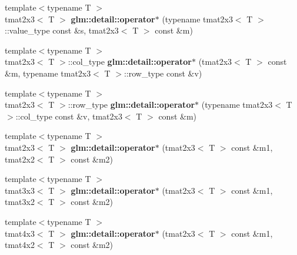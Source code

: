 \begin{DoxyCompactItemize}
\item 
\hypertarget{namespaceglm_1_1detail_a4c09dd8ee896836a72872073c92da81e}{{\footnotesize template$<$typename T $>$ }\\tmat2x3$<$ \-T $>$ {\bfseries glm\-::detail\-::operator$\ast$} (typename tmat2x3$<$ \-T $>$\-::value\-\_\-type const \&s, tmat2x3$<$ \-T $>$ const \&m)}\label{namespaceglm_1_1detail_a4c09dd8ee896836a72872073c92da81e}

\item 
\hypertarget{namespaceglm_1_1detail_a79596c9025879da74bbbcdca8846287b}{{\footnotesize template$<$typename T $>$ }\\tmat2x3$<$ \-T $>$\-::col\-\_\-type {\bfseries glm\-::detail\-::operator$\ast$} (tmat2x3$<$ \-T $>$ const \&m, typename tmat2x3$<$ \-T $>$\-::row\-\_\-type const \&v)}\label{namespaceglm_1_1detail_a79596c9025879da74bbbcdca8846287b}

\item 
\hypertarget{namespaceglm_1_1detail_afd8b1f49e105e275ed1ecdce26bd4228}{{\footnotesize template$<$typename T $>$ }\\tmat2x3$<$ \-T $>$\-::row\-\_\-type {\bfseries glm\-::detail\-::operator$\ast$} (typename tmat2x3$<$ \-T $>$\-::col\-\_\-type const \&v, tmat2x3$<$ \-T $>$ const \&m)}\label{namespaceglm_1_1detail_afd8b1f49e105e275ed1ecdce26bd4228}

\item 
\hypertarget{namespaceglm_1_1detail_a6790380992b7cd2a32f63370413fddf5}{{\footnotesize template$<$typename T $>$ }\\tmat2x3$<$ \-T $>$ {\bfseries glm\-::detail\-::operator$\ast$} (tmat2x3$<$ \-T $>$ const \&m1, tmat2x2$<$ \-T $>$ const \&m2)}\label{namespaceglm_1_1detail_a6790380992b7cd2a32f63370413fddf5}

\item 
\hypertarget{namespaceglm_1_1detail_a9b1d831e6307752435cbe7105917b65e}{{\footnotesize template$<$typename T $>$ }\\tmat3x3$<$ \-T $>$ {\bfseries glm\-::detail\-::operator$\ast$} (tmat2x3$<$ \-T $>$ const \&m1, tmat3x2$<$ \-T $>$ const \&m2)}\label{namespaceglm_1_1detail_a9b1d831e6307752435cbe7105917b65e}

\item 
\hypertarget{namespaceglm_1_1detail_a9a46b5273873c8ae60166fa12231f842}{{\footnotesize template$<$typename T $>$ }\\tmat4x3$<$ \-T $>$ {\bfseries glm\-::detail\-::operator$\ast$} (tmat2x3$<$ \-T $>$ const \&m1, tmat4x2$<$ \-T $>$ const \&m2)}\label{namespaceglm_1_1detail_a9a46b5273873c8ae60166fa12231f842}


\end{DoxyCompactItemize}
